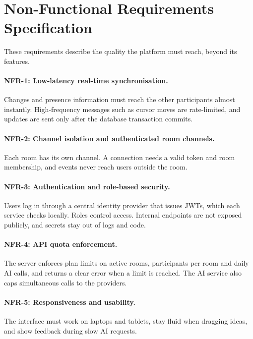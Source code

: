 \documentclass[12pt,a4paper]{report}
\begin{document}
\section{Non-Functional Requirements Specification}
\label{sec:nonfunctional}

These requirements describe the quality the platform must reach, beyond its features.

\paragraph{NFR-1: Low-latency real-time synchronisation.}
Changes and presence information must reach the other participants almost instantly. High-frequency messages such as cursor moves are rate-limited, and updates are sent only after the database transaction commits.

\paragraph{NFR-2: Channel isolation and authenticated room channels.}
Each room has its own channel. A connection needs a valid token and room membership, and events never reach users outside the room.

\paragraph{NFR-3: Authentication and role-based security.}
Users log in through a central identity provider that issues JWTs, which each service checks locally. Roles control access. Internal endpoints are not exposed publicly, and secrets stay out of logs and code.

\paragraph{NFR-4: API quota enforcement.}
The server enforces plan limits on active rooms, participants per room and daily AI calls, and returns a clear error when a limit is reached. The AI service also caps simultaneous calls to the providers.

\paragraph{NFR-5: Responsiveness and usability.}
The interface must work on laptops and tablets, stay fluid when dragging ideas, and show feedback during slow AI requests.
\end{document}

